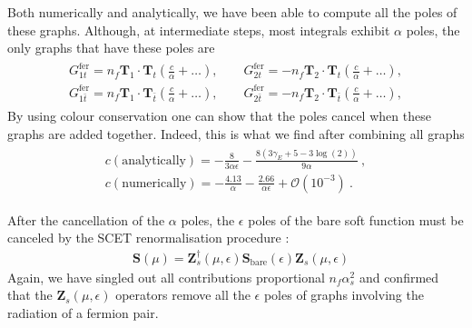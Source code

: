 \documentclass{appolb}
\newcommand{\Bf}[1]{\mathbf{#1}}
\begin{document}
Both numerically and analytically, we have been able to compute all the poles of these graphs. Although, at intermediate steps, most integrals exhibit $\alpha$ poles, the only graphs that have these poles are
\begin{align}
\begin{gathered}
G^{\text{fer}}_{1t} = n_f  \Bf{T}_1\cdot \Bf{T}_t\left( \frac{c}{\alpha}+\dots\right), \qquad G^{\text{fer}}_{2t} = -n_f \Bf{T}_2\cdot \Bf{T}_t  \left( \frac{c}{\alpha}+\dots\right),\\
G^{\text{fer}}_{1\bar{t}} =n_f \Bf{T}_1\cdot \Bf{T}_{\bar{t}} \left( \frac{c}{\alpha}+\dots\right), 
\qquad G^{\text{fer}}_{2\bar{t}} = - n_f \Bf{T}_2\cdot \Bf{T}_{\bar{t}} \left( \frac{c}{\alpha}+\dots \right),
\end{gathered}
\end{align}
By using colour conservation one can show that the poles cancel when these graphs are added together. 
Indeed, this is what we find after combining all graphs
\begin{align}
\begin{gathered}
c (\text{analytically})= -\frac{8 }{3 \alpha \epsilon}-\frac{8 (3 \gamma_E +5-3 \log (2))}{9 \alpha}~,\\
c (\text{numerically})= -\frac{4.13}{\alpha} - 	\frac{2.66}{\alpha \epsilon} +\mathcal{O}(10^{-3})~.
\end{gathered}
\end{align}

After the cancellation of the $\alpha$ poles, the $\epsilon$ poles of the bare soft function must be canceled by the SCET renormalisation procedure 
\cite{Zhu:2012ts}:
\begin{align}
&  \Bf{S}(\mu) = \Bf{Z}^\dagger_s(\mu,\epsilon) \Bf{S}_{\text{bare}}(\epsilon)
  \Bf{Z}_s(\mu,\epsilon) 
\end{align}
Again, we have singled out all contributions proportional $n_f\alpha_s^2$ and confirmed that the $\Bf{Z}_s(\mu,\epsilon)$ operators remove all the $\epsilon$ poles of graphs involving the radiation of a fermion pair. 
\end{document}
